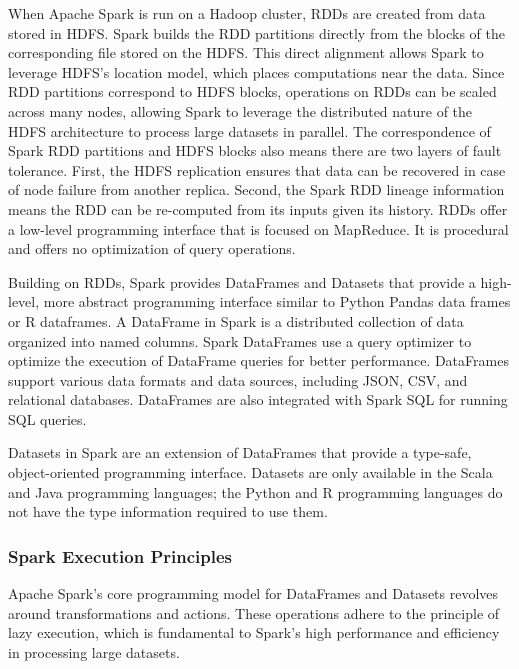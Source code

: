 When Apache Spark is run on a Hadoop cluster, RDDs are created from data stored in HDFS. Spark builds the RDD partitions directly from the blocks of the corresponding file stored on the HDFS. This direct alignment allows Spark to leverage HDFS's location model, which places computations near the data. Since RDD partitions correspond to HDFS blocks, operations on RDDs can be scaled across many nodes, allowing Spark to leverage the distributed nature of the HDFS architecture to process large datasets in parallel. The correspondence of Spark RDD partitions and HDFS blocks also means there are two layers of fault tolerance. First, the HDFS replication ensures that data can be recovered in case of node failure from another replica. Second, the Spark RDD lineage information means the RDD can be re-computed from its inputs given its history. RDDs offer a low-level programming interface that is focused on MapReduce. It is procedural and offers no optimization of query operations. 

Building on RDDs, Spark provides DataFrames and Datasets  that provide a high-level, more abstract programming interface similar to Python Pandas data frames or R dataframes. A DataFrame in Spark is a distributed collection of data organized into named columns. Spark DataFrames use a query optimizer to optimize the execution of DataFrame queries for better performance. DataFrames support various data formats and data sources, including JSON, CSV, and relational databases. DataFrames are also integrated with Spark SQL for running SQL queries.

Datasets in Spark are an extension of DataFrames that provide a type-safe, object-oriented programming interface. Datasets are only available in the Scala and Java programming languages; the Python and R programming languages do not have the type information required to use them.

\subsubsection*{Spark Execution Principles}

Apache Spark's core programming model for DataFrames and Datasets revolves around transformations and actions. These operations adhere to the principle of lazy execution, which is fundamental to Spark's high performance and efficiency in processing large datasets.

